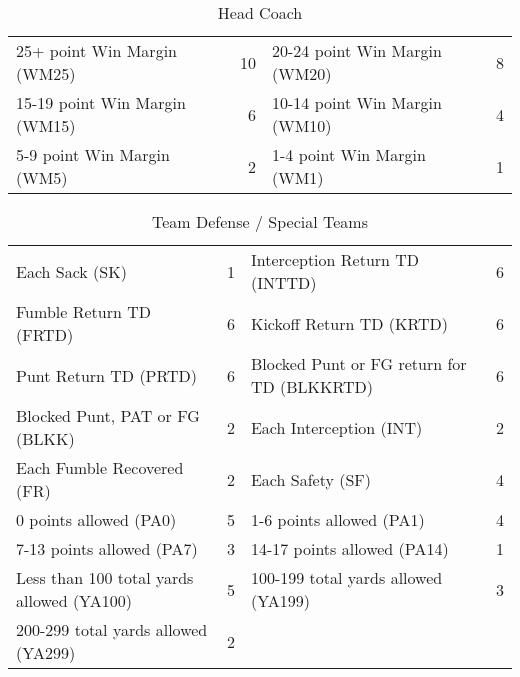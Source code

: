 \documentclass{article}
\begin{document}
    \begin{table}[h]
        \caption{Head Coach}
        \begin{tabular}{lr|lr}
            \hline
            25+ point Win Margin (WM25) & 10 & 20-24 point Win Margin (WM20) & 8\\
            15-19 point Win Margin (WM15) & 6 & 10-14 point Win Margin (WM10) & 4\\
            5-9 point Win Margin (WM5) & 2 & 1-4 point Win Margin (WM1) & 1\\
            \hline
        \end{tabular}
    \end{table}
    \begin{table}[H]
        \caption{Team Defense / Special Teams}
        \centering
        \begin{tabular}{lr|lr}
            \hline
            Each Sack (SK) & 1 & Interception Return TD (INTTD) & 6\\
            Fumble Return TD (FRTD) & 6 & Kickoff Return TD (KRTD) & 6\\
            Punt Return TD (PRTD) & 6 & Blocked Punt or FG return for TD (BLKKRTD) & 6\\
            Blocked Punt, PAT or FG (BLKK) & 2 & Each Interception (INT) & 2\\
            Each Fumble Recovered (FR) & 2 & Each Safety (SF) & 4\\
            0 points allowed (PA0) & 5 & 1-6 points allowed (PA1) & 4\\
            7-13 points allowed (PA7) & 3 & 14-17 points allowed (PA14) & 1\\
            Less than 100 total yards allowed (YA100) & 5 & 100-199 total yards allowed (YA199) & 3\\
            200-299 total yards allowed (YA299) & 2\\
            \hline
        \end{tabular}
    \end{table}
\end{document}
